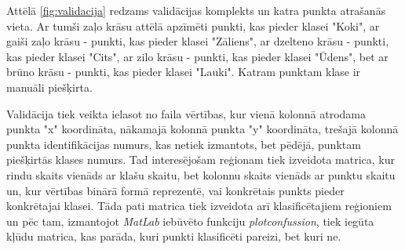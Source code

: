 \documentclass[12pt,paper=a4]{report}
\begin{document}
Attēlā \ref{fig:validacija} redzams validācijas komplekts un katra punkta atrašanās vieta. Ar tumši zaļo krāsu attēlā apzīmēti punkti, kas pieder klasei "Koki", ar gaiši zaļo krāsu - punkti, kas pieder klasei "Zāliens", ar dzelteno krāsu - punkti, kas pieder klasei "Cits", ar zilo krāsu - punkti, kas pieder klasei "Ūdens", bet ar brūno krāsu - punkti, kas pieder klasei "Lauki". Katram punktam klase ir manuāli piešķirta.\par
Validācija tiek veikta ielasot no faila vērtības, kur vienā kolonnā atrodama punkta "x" koordināta, nākamajā kolonnā punkta "y" koordināta, trešajā kolonnā punkta identifikācijas numurs, kas netiek izmantots, bet pēdējā, punktam piešķirtās klases numurs. Tad interesējošam reģionam tiek izveidota matrica, kur rindu skaits vienāds ar klašu skaitu, bet kolonnu skaits vienāds ar punktu skaitu un, kur vērtības binārā formā reprezentē, vai konkrētais punkts pieder konkrētajai klasei. Tāda pati matrica tiek izveidota arī klasificētajiem reģioniem un pēc tam, izmantojot \textit{MatLab} iebūvēto funkciju \textit{plotconfussion}, tiek iegūta kļūdu matrica, kas parāda, kuri punkti klasificēti pareizi, bet kuri ne.\par
\end{document}
